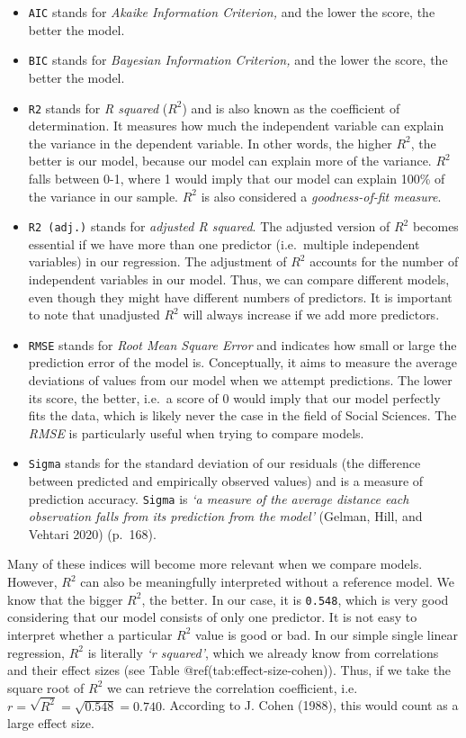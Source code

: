 \documentclass[
  letterpaper,
]{krantz}
\begin{document}
\begin{itemize}
\item
  \texttt{AIC} stands for \emph{Akaike Information Criterion,} and the
  lower the score, the better the model.
\item
  \texttt{BIC} stands for \emph{Bayesian Information Criterion,} and the
  lower the score, the better the model.
\item
  \texttt{R2} stands for \emph{R squared} (\(R^2\)) and is also known as
  the coefficient of determination. It measures how much the independent
  variable can explain the variance in the dependent variable. In other
  words, the higher \(R^2\), the better is our model, because our model
  can explain more of the variance. \(R^2\) falls between 0-1, where 1
  would imply that our model can explain 100\% of the variance in our
  sample. \(R^2\) is also considered a \emph{goodness-of-fit measure}.
\item
  \texttt{R2\ (adj.)} stands for \emph{adjusted R squared}. The adjusted
  version of \(R^2\) becomes essential if we have more than one
  predictor (i.e.~multiple independent variables) in our regression. The
  adjustment of \(R^2\) accounts for the number of independent variables
  in our model. Thus, we can compare different models, even though they
  might have different numbers of predictors. It is important to note
  that unadjusted \(R^2\) will always increase if we add more
  predictors.
\item
  \texttt{RMSE} stands for \emph{Root Mean Square Error} and indicates
  how small or large the prediction error of the model is. Conceptually,
  it aims to measure the average deviations of values from our model
  when we attempt predictions. The lower its score, the better, i.e.~a
  score of 0 would imply that our model perfectly fits the data, which
  is likely never the case in the field of Social Sciences. The
  \emph{RMSE} is particularly useful when trying to compare models.
\item
  \texttt{Sigma} stands for the standard deviation of our residuals (the
  difference between predicted and empirically observed values) and is a
  measure of prediction accuracy. \texttt{Sigma} is \emph{`a measure of
  the average distance each observation falls from its prediction from
  the model'} (Gelman, Hill, and Vehtari 2020) (p.~168).
\end{itemize}

Many of these indices will become more relevant when we compare models.
However, \(R^2\) can also be meaningfully interpreted without a
reference model. We know that the bigger \(R^2\), the better. In our
case, it is \texttt{0.548}, which is very good considering that our
model consists of only one predictor. It is not easy to interpret
whether a particular \(R^2\) value is good or bad. In our simple single
linear regression, \(R^2\) is literally \emph{`r squared'}, which we
already know from correlations and their effect sizes (see Table
@ref(tab:effect-size-cohen)). Thus, if we take the square root of
\(R^2\) we can retrieve the correlation coefficient,
i.e.~\(r = \sqrt{R^2} = \sqrt{0.548} = 0.740\). According to J. Cohen
(1988), this would count as a large effect size.
\end{document}
